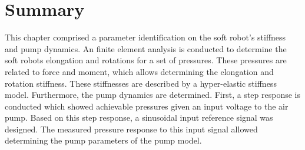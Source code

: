 \section*{Summary} 

This chapter comprised a parameter identification on the soft robot's stiffness and pump dynamics. An finite element analysis is conducted to determine the soft robots elongation and rotations for a set of pressures. These pressures are related to force and moment, which allows determining the elongation and rotation stiffness. These stiffnesses are described by a hyper-elastic stiffness model. Furthermore, the pump dynamics are determined. First, a step response is conducted which showed achievable pressures given an input voltage to the air pump. Based on this step response, a sinusoidal input reference signal was designed. The measured pressure response to this input signal allowed determining the pump parameters of the pump model. 


